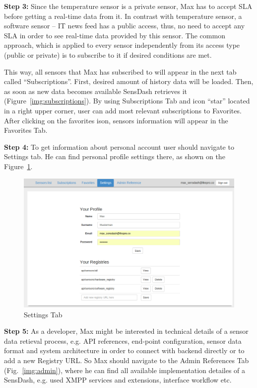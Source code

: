 \textbf{Step 3:} Since the temperature sensor is a private sensor, Max has to accept SLA before getting a real-time data from it. In contrast with temperature sensor, a software sensor -- IT news feed has a public access, thus, no need to accept any SLA in order to see real-time data provided by this sensor. The common approach, which is applied to every sensor independently from its access type (public or private) is to subscribe to it if desired conditions are met.

This way, all sensors that Max has subscribed to will appear in the next tab called ``Subscriptions''. First, desired amount of history data will be loaded. Then, as soon as new data becomes available SensDash retrieves it (Figure~\ref{img:subscriptions}). By using Subscriptions Tab and icon ``star'' located in a right upper corner, user can add most relevant subscriptions to Favorites. After clicking on the favorites ison, sensors information will appear in the Favorites Tab.

\textbf{Step 4:} To get information about personal account user should navigate to Settings tab. He can find personal profile settings there, as shown on the Figure~\ref{img:settings}.

\begin{figure}[!ht]
\centering
\includegraphics[scale=0.5]{Screenshots/UseCaseScreenshot6.png}   
\caption[Settings Tab]{Settings Tab}
\label{img:settings}                         
\end{figure}

\textbf{Step 5:} As a developer, Max might be interested in technical details of a sensor data retieval process, e.g. API references, end-point configuration, sensor data format and system architecture in order to connect with backend directly or to add a new Registry URL. So Max should navigate to the Admin References Tab (Fig.~\ref{img:admin}), where he can find all available implementation detailes of a SensDash, e.g. used XMPP services and extensions, interface workflow etc. 

